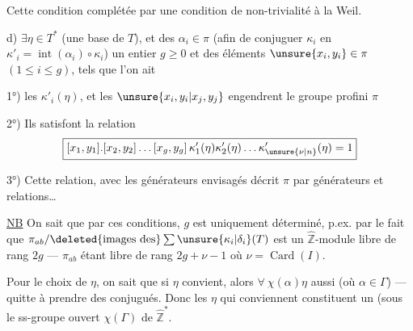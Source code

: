 Cette condition  complétée par une condition de non-trivialité à la Weil.

d) \(\exists\eta\in T^*\) (une base de \(T\)), et des
\(\alpha_i\in\pi\) (afin de conjuguer \(\kappa_i\) en
\(\kappa'_i=\operatorname{int}(\alpha_i)\circ\kappa_i\))
 un entier \(g\geq0\) et des éléments
\(\unsure{x_i,y_i}\in\pi\) \((1\leq i\leq g)\), tels que l'on ait



1°) les \(\kappa'_i(\eta)\),  et les
\(\unsure{x_i,y_i|x_j,y_j}\) engendrent le groupe profini \(\pi\)

2°) Ils satisfont la relation
\[
\boxed{[x_1,y_1].[x_2,y_2]\ldots[x_g,y_g]\,
\kappa'_1(\eta)\kappa'_2(\eta)\ldots\kappa'_{\unsure{\nu|n}}(\eta)=1}
\]

3°) Cette relation, avec les générateurs envisagés décrit \(\pi\)
 par générateurs et relations\ldots

\uline{NB} On sait que par ces conditions, \(g\) est uniquement déterminé,
p.ex. par le fait que
\(\pi_{ab}/\deleted{\text{images des}}\sum\unsure{\kappa_i|\delta_i}(T)\)
est un \(\widehat{\mathbb Z}\)-module libre de rang \(2g\) --- \(\pi_{ab}\)
étant libre de rang \(2g+\nu-1\) où \(\nu=\operatorname{Card}(I)\).

Pour le choix de \(\eta\), on sait que si \(\eta\) convient, alors
\(\forall\ \chi(\alpha)\eta\) aussi (où \(\alpha\in\Gamma\)) --- quitte à prendre
des conjugués. Donc les \(\eta\) qui conviennent  constituent
un  (sous le ss-groupe ouvert
\(\chi(\Gamma)\) de \(\widehat{\mathbb Z}^{*}\).





